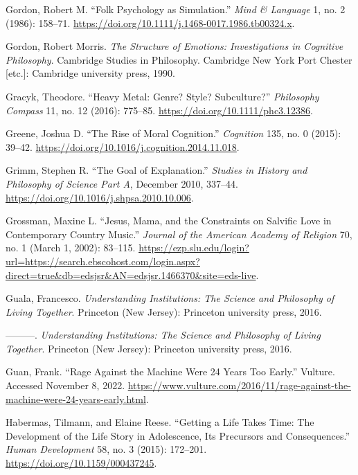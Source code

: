 \documentclass[
  12pt,
]{book}
\newlength{\cslhangindent}
\newenvironment{CSLReferences}[2] %
 {\begin{list}{}{%
  \setlength{\itemindent}{0pt}
  \setlength{\leftmargin}{0pt}
  \setlength{\parsep}{0pt}
  \ifodd #1
   \setlength{\leftmargin}{\cslhangindent}
   \setlength{\itemindent}{-1\cslhangindent}
  \fi
  \setlength{\itemsep}{#2\baselineskip}}}
 {\end{list}}
\theoremstyle{definition}
\theoremstyle{definition}
\theoremstyle{definition}
\theoremstyle{definition}
\theoremstyle{remark}
\begin{document}
\begin{CSLReferences}{1}{0}
Gordon, Robert M. {``Folk Psychology as Simulation.''} \emph{Mind \& Language} 1, no. 2 (1986): 158--71. \url{https://doi.org/10.1111/j.1468-0017.1986.tb00324.x}.

Gordon, Robert Morris. \emph{The Structure of Emotions: Investigations in Cognitive Philosophy}. Cambridge Studies in Philosophy. Cambridge New York Port Chester {[}etc.{]}: Cambridge university press, 1990.

Gracyk, Theodore. {``Heavy Metal: Genre? {Style}? {Subculture}?''} \emph{Philosophy Compass} 11, no. 12 (2016): 775--85. \url{https://doi.org/10.1111/phc3.12386}.

Greene, Joshua D. {``The Rise of Moral Cognition.''} \emph{Cognition} 135, no. 0 (2015): 39--42. \url{https://doi.org/10.1016/j.cognition.2014.11.018}.

Grimm, Stephen R. {``The Goal of Explanation.''} \emph{Studies in History and Philosophy of Science Part A}, December 2010, 337--44. \url{https://doi.org/10.1016/j.shpsa.2010.10.006}.

Grossman, Maxine L. {``Jesus, {Mama}, and the {Constraints} on {Salvific Love} in {Contemporary Country Music}.''} \emph{Journal of the American Academy of Religion} 70, no. 1 (March 1, 2002): 83--115. \url{https://ezp.slu.edu/login?url=https://search.ebscohost.com/login.aspx?direct=true&db=edsjsr&AN=edsjsr.1466370&site=eds-live}.

Guala, Francesco. \emph{Understanding Institutions: The Science and Philosophy of Living Together}. Princeton (New Jersey): Princeton university press, 2016.

---------. \emph{Understanding {Institutions}: {The Science} and {Philosophy} of {Living Together}}. Princeton (New Jersey): Princeton university press, 2016.

Guan, Frank. {``Rage Against the Machine Were 24 Years Too Early.''} Vulture. Accessed November 8, 2022. \url{https://www.vulture.com/2016/11/rage-against-the-machine-were-24-years-early.html}.

Habermas, Tilmann, and Elaine Reese. {``Getting a Life Takes Time: The Development of the Life Story in Adolescence, Its Precursors and Consequences.''} \emph{Human Development} 58, no. 3 (2015): 172--201. \url{https://doi.org/10.1159/000437245}.


\end{CSLReferences}
\end{document}
